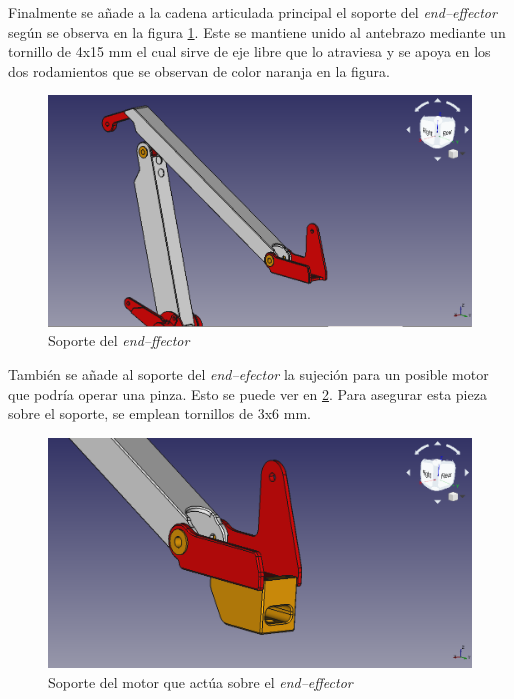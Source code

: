 Finalmente se añade a la cadena articulada principal el soporte del \textit{end--effector} según se observa en la figura \ref{fig:soporte_endeffector}. Este se mantiene unido al antebrazo mediante un tornillo de 4x15 mm el cual sirve de eje libre que lo atraviesa y se apoya en los dos rodamientos que se observan de color naranja en la figura.

\begin{figure}[H]
    \centering 
    \includegraphics[width=1\linewidth]{pictures/SoporteEndEffector.png}
    \caption{Soporte del \textit{end--ffector}}
    \label{fig:soporte_endeffector}
\end{figure}

También se añade al soporte del \textit{end--efector} la sujeción para un posible motor que podría operar una pinza. Esto se puede ver en \ref{fig:soporte_motor}. Para asegurar esta pieza sobre el soporte, se emplean tornillos de 3x6 mm.

\begin{figure}[H]
    \centering 
    \includegraphics[width=1\linewidth]{pictures/SujecionMotorFinal.png}
    \caption{Soporte del motor que actúa sobre el \textit{end--effector}}
    \label{fig:soporte_motor}
\end{figure}

